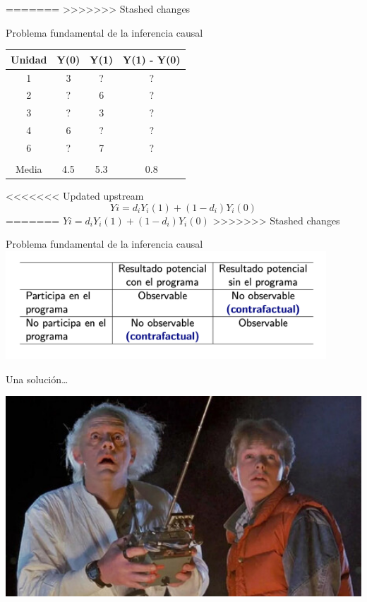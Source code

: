 \documentclass[
  ignorenonframetext,
]{beamer}
\begin{document}
=======
>>>>>>> Stashed changes
\begin{frame}{Problema fundamental de la inferencia causal}
\protect\hypertarget{problema-fundamental-de-la-inferencia-causal}{}
\pause
\begin{table}[]
\begin{tabular}{cccc}
Unidad & Y(0) & Y(1) & Y(1) - Y(0) \\ \hline
1      & 3    & ?    & ?           \\
2      & ?    & 6    & ?           \\
3      & ?    & 3    & ?           \\
4      & 6    & ?    & ?           \\ 
6      & ?    & 7    & ?           \\ 
       &      &      &             \\ 

Media  & 4.5  & 5.3  & 0.8           \\ \hline
\end{tabular}
\end{table}

\pause

<<<<<<< Updated upstream
\[Yi = d_i Y_i(1) + (1 - d_i) Y_i(0)\]
=======
\(Yi = d_i Y_i(1) + (1 - d_i) Y_i(0)\)
>>>>>>> Stashed changes
\end{frame}

\begin{frame}{Problema fundamental de la inferencia causal}
\protect\hypertarget{problema-fundamental-de-la-inferencia-causal-1}{}
\includegraphics[width=0.9\textwidth,height=\textheight]{figs/resultados_potenciales}
\end{frame}

\begin{frame}{Una solución\ldots{}}
\protect\hypertarget{una-soluciuxf3n}{}
\pause
\center

\includegraphics[width=1\textwidth,height=\textheight]{figs/volver_al_futuro}
\end{frame}
\end{document}
